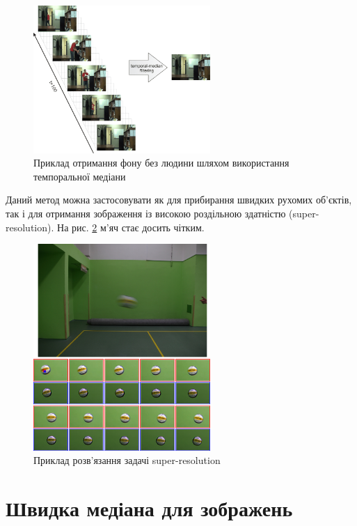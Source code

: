 \begin{figure}[H]
    \centering
    \includegraphics[width=0.6\textwidth]{images/temporal_median_example_1}
    \caption{Приклад отримання фону без людини шляхом використання темпоральної медіани
        \cite{temporal_median_example_1}
        \label{fig:temporal_median_example_1}
    }
\end{figure}
Даний метод можна застосовувати як для прибирання швидких рухомих об'єктів,
так і для  отримання зображення із високою роздільною здатністю (super-resolution).
На рис. \ref{fig:temporal_median_example_2} м'яч  стає досить чітким.

\begin{figure}[H]
    \centering
    \includegraphics[width=0.6\textwidth]{images/temporal_median_example_2}
    \caption{Приклад розв'язання задачі super-resolution \cite{temporal_median_example_2}
        \label{fig:temporal_median_example_2}
    }
\end{figure}

\section{Швидка медіана для зображень}

